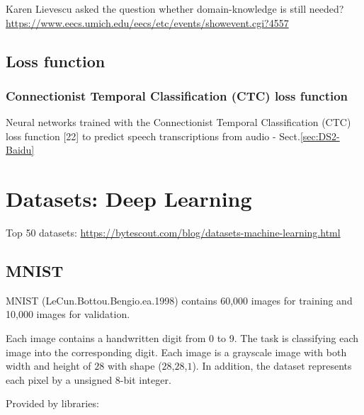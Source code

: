 Karen Lievescu asked the question whether domain-knowledge is still needed?
\url{https://www.eecs.umich.edu/eecs/etc/events/showevent.cgi?4557}


\section{Loss function}

\subsection{Connectionist Temporal Classification (CTC)
loss function}
\label{sec:CTC-loss-function}

Neural networks trained with the Connectionist Temporal Classification (CTC)
loss function [22] to predict speech transcriptions from audio - Sect.\ref{sec:DS2-Baidu}


\chapter{Datasets: Deep Learning}


Top 50 datasets:
\url{https://bytescout.com/blog/datasets-machine-learning.html}

\section{MNIST}
\label{sec:dataset-digits-MNIST}

MNIST (LeCun.Bottou.Bengio.ea.1998) contains 60,000 images for training and
10,000 images for validation.

Each image contains a handwritten digit from 0 to 9. The task is classifying
each image into the corresponding digit.
Each image is a grayscale image with both width and height of $28$ with shape ($28$,$28$,$1$).
In addition, the dataset represents each pixel by a unsigned $8$-bit integer.

Provided by libraries:

